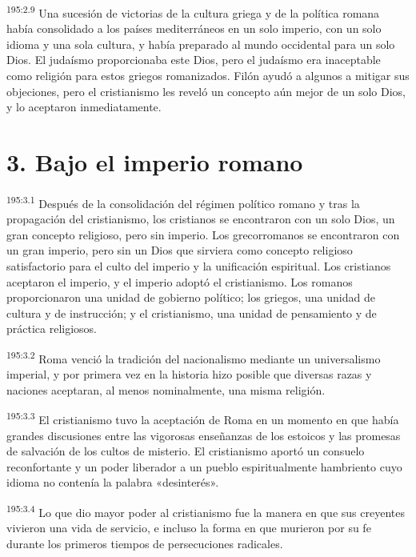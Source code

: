\par
\textsuperscript{195:2.9} Una sucesión de victorias de la cultura griega y de la política romana había consolidado a los países mediterráneos en un solo imperio, con un solo idioma y una sola cultura, y había preparado al mundo occidental para un solo Dios. El judaísmo proporcionaba este Dios, pero el judaísmo era inaceptable como religión para estos griegos romanizados. Filón ayudó a algunos a mitigar sus objeciones, pero el cristianismo les reveló un concepto aún mejor de un solo Dios, y lo aceptaron inmediatamente.

\section*{3. Bajo el imperio romano}
\par
\textsuperscript{195:3.1} Después de la consolidación del régimen político romano y tras la propagación del cristianismo, los cristianos se encontraron con un solo Dios, un gran concepto religioso, pero sin imperio. Los grecorromanos se encontraron con un gran imperio, pero sin un Dios que sirviera como concepto religioso satisfactorio para el culto del imperio y la unificación espiritual. Los cristianos aceptaron el imperio, y el imperio adoptó el cristianismo. Los romanos proporcionaron una unidad de gobierno político; los griegos, una unidad de cultura y de instrucción; y el cristianismo, una unidad de pensamiento y de práctica religiosos.

\par
\textsuperscript{195:3.2} Roma venció la tradición del nacionalismo mediante un universalismo imperial, y por primera vez en la historia hizo posible que diversas razas y naciones aceptaran, al menos nominalmente, una misma religión.

\par
\textsuperscript{195:3.3} El cristianismo tuvo la aceptación de Roma en un momento en que había grandes discusiones entre las vigorosas enseñanzas de los estoicos y las promesas de salvación de los cultos de misterio. El cristianismo aportó un consuelo reconfortante y un poder liberador a un pueblo espiritualmente hambriento cuyo idioma no contenía la palabra «desinterés».

\par
\textsuperscript{195:3.4} Lo que dio mayor poder al cristianismo fue la manera en que sus creyentes vivieron una vida de servicio, e incluso la forma en que murieron por su fe durante los primeros tiempos de persecuciones radicales.

